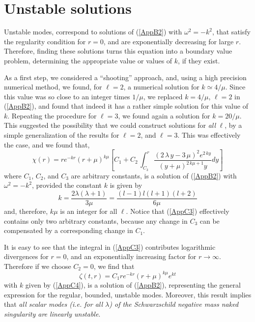 \documentclass[12pt,aps,floats,showpacs,amssymb,tightenlines]{revtex4}
\begin{document}
\section{Unstable solutions} \label{us}

Unstable modes, correspond to solutions of (\ref{AppB2}) with $\omega^2 =-k^2$, that
 satisfy the regularity condition for $r=0$, and are exponentially decreasing for large $r$.
  Therefore, finding these solutions  turns this equation into a boundary value problem,
  determining the appropriate value or values of $k$, if they exist.

As a first step, we considered a ``shooting'' approach, and, using a high precision
numerical method, we found, for $\ell=2$, a numerical solution for $k \simeq 4/\mu$.
Since this value was so close to an integer times $1/\mu$, we
replaced $k = 4/\mu$, $\ell=2$ in (\ref{AppB2}), and found that indeed it has a rather
simple solution for this value of $k$. Repeating the procedure for $\ell=3$, we found again
a solution for $k=20/\mu$. This suggested the possibility that we could construct solutions
 for {\em all} $\ell$, by a simple generalization of the results for $\ell=2$, and $\ell=3$.
 This was effectively the case, and we found that,
\begin{equation}
\label{AppC3}
 {\chi} ( r )  = r{e^{-kr}} \left( r+\mu \right) ^{k\mu}
 \left[ {C_1}+{C_2}\,\int _{{C_3}}^{r}\!{\frac { \left( 2\,
\lambda\,y-3\,\mu \right) ^{2}{e^{2\,ky}}}{ \left( y+\mu \right) ^{2\,
k\mu+1}y}}{dy} \right]
\end{equation}
where $C_1$, $C_2$, and $C_3$ are arbitrary constants, is a solution of (\ref{AppB2}) with
$\omega^2=-k^2$, provided  the constant $k$ is given by
\begin{equation}
\label{AppC4}
 k = \frac{2\lambda (\lambda+1)}{3 \mu}=\frac{ (l-1) l (l+1) (l+2)} {6 \mu}
\end{equation}
and, therefore, $k\mu$ is an integer for all $\ell$. Notice that (\ref{AppC3}) effectively
 contains only two arbitrary constants, because any change in $C_3$ can be compensated by a
 corresponding change in $C_1$.

It is easy to see that the integral in (\ref{AppC3}) contributes logarithmic divergences for
 $r=0$, and an exponentially increasing factor for $r \rightarrow \infty$. Therefore if we
 choose $C_2=0$, we find that
\begin{equation}
\label{AppC5}
 {\zeta} ( t, r )  = C_1 r{e^{-kr}} \left( r+\mu \right) ^{k\mu}e^{kt}
\end{equation}
with $k$ given by (\ref{AppC4}), is a solution of (\ref{AppB2}), representing
 the general expression for the regular, bounded, unstable modes.
Moreover, this result implies that {\em all scalar modes (i.e. for all $\lambda$) of the Schwarzschild negative
mass naked singularity are linearly unstable}.
\end{document}
